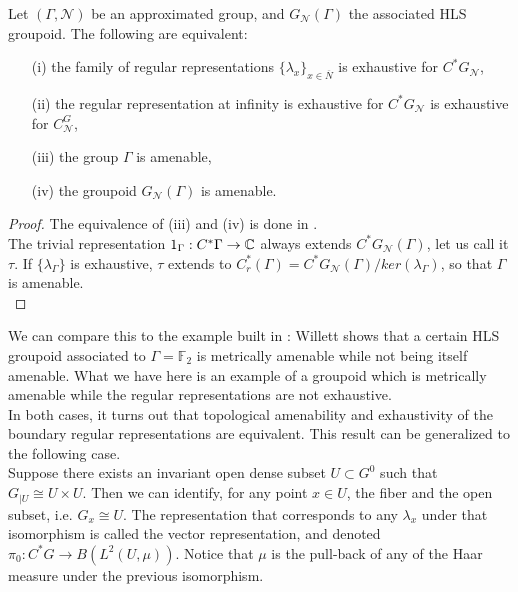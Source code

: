 \begin{cor}
Let $(\Gamma, \mathcal N)$ be an approximated group, and $G_{\mathcal N}(\Gamma)$ the associated HLS groupoid. The following are equivalent:
\begin{itemize}
\item[(i)] the family of regular representations $\{\lambda_x\}_{x\in \overline N}$ is exhaustive for $C^*G_{\mathcal N}$,
\item[(ii)] the regular representation at infinity is exhaustive for $C^*G_{\mathcal N}$ is exhaustive for $C^G_{\mathcal N}$,
\item[(iii)] the group $\Gamma$ is amenable,
\item[(iv)] the groupoid $G_{\mathcal N}(\Gamma)$ is amenable. 
\end{itemize}
\end{cor}

\begin{proof}
The equivalence of (iii) and (iv) is done in \cite{WillettNonamenable}.\\

The trivial representation $1_\Gamma: C^*\Gamma \rightarrow \mathbb C$ always extends $C^*G_{\mathcal N}(\Gamma)$, let us call it $\tau$. If $\{\lambda_\Gamma\}$ is exhaustive, $\tau$ extends to $C^*_r(\Gamma)= C^*G_{\mathcal N}(\Gamma)/ker(\lambda_\Gamma)$, so that $\Gamma$ is amenable. \\
\end{proof}

We can compare this to the example built in \cite{WillettNonamenable}: Willett shows that a certain HLS groupoid associated to $\Gamma=\mathbb F_2$ is metrically amenable while not being itself amenable. What we have here is an example of a groupoid which is metrically amenable while the regular representations are not exhaustive.\\

In both cases, it turns out that topological amenability and exhaustivity of the boundary regular representations are equivalent. This result can be generalized to the following case.\\

Suppose there exists an invariant open dense subset $U\subset G^0$ such that $G_{|U}\cong U\times U$. Then we can identify, for any point $x\in U$, the fiber and the open subset, i.e. $G_x\cong U$. The representation that corresponds to any $\lambda_x$ under that isomorphism is called the vector representation, and denoted $\pi_0 : C^*G \rightarrow B(L^2(U,\mu))$. Notice that $\mu $ is the pull-back of any of the Haar measure under the previous isomorphism.\\

